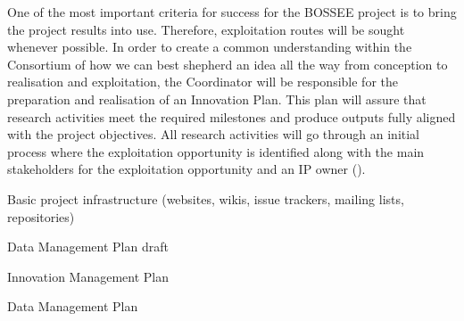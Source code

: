 \begin{workpackage}
\begin{tasklist}
\begin{task}[
  title=Innovation Management,
  id=innovation-management,
  lead=SRL,
  PM=6,
  wphases={0-48},
  partners={CDS,EGI,EP,INSERM,QS,UIO,UPSUD,SIL,WTT,XFEL}
]
One of the most important criteria for success for the BOSSEE project is to bring the project results into use. Therefore, exploitation routes will be sought whenever possible. In order to create a common understanding within the Consortium of how we can best shepherd an idea all the way from conception to realisation and exploitation, the Coordinator will be responsible for the preparation and realisation of an Innovation Plan. This plan will assure that research activities meet the required milestones and produce outputs fully aligned with the project objectives. All research activities will go through an initial process where the exploitation opportunity is identified along with the main stakeholders for the exploitation opportunity and an IP owner
().
\end{task}

\end{tasklist}


\begin{wpdelivs}


\begin{wpdeliv}[due=1,miles=startup,id=infrastructure,dissem=PU,nature=DEC,lead=SRL]
  {Basic project infrastructure (websites, wikis, issue trackers, mailing lists, repositories)}
\end{wpdeliv}

\begin{wpdeliv}[due=9,miles=startup,id=data-management-plan-draft,dissem=PU,nature=R,lead=SRL]
  {Data Management Plan draft}
\end{wpdeliv}

\begin{wpdeliv}[due=9,miles=startup,id=innovation-management-plan,dissem=CO,nature=R,lead=SRL]
  {Innovation Management Plan}
\end{wpdeliv}

\begin{wpdeliv}[due=48,miles=final,id=data-management-plan,dissem=PU,nature=R,lead=SRL]
  {Data Management Plan}
\end{wpdeliv}

\end{wpdelivs}
\end{workpackage}

